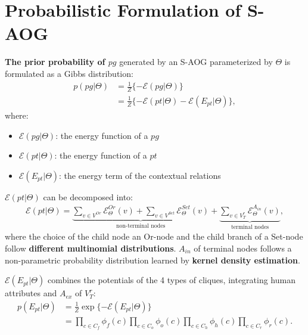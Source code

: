 \documentclass[10pt]{article}
\begin{document}
\section{Probabilistic Formulation of S-AOG}%
\label{sec:formulation}
\textbf{The prior probability of $pg$} generated by an S-AOG parameterized by
$\Theta$ is formulated as a Gibbs distribution:
%
\begin{align}
  p(pg \vert \Theta) &= \frac{1}{Z} \{-\mathcal{E}(pg \vert \Theta)\} \label{eq:1} \\
                     &= \frac{1}{Z} \{-\mathcal{E}(pt \vert \Theta) - \mathcal{E}(E_{pt} \vert \Theta)\}, \label{eq:2}
\end{align}
%
where:
%
\begin{itemize}
  \item $\mathcal{E}(pg \vert \Theta)$: the energy function of a $pg$
  \item $\mathcal{E}(pt \vert \Theta)$: the energy function of a $pt$
  \item $\mathcal{E}(E_{pt} \vert \Theta)$: the energy term of the contextual
    relations
\end{itemize}
%
$\mathcal{E}(pt \vert \Theta)$ can be decomposed into:
%
\begin{align}
  \label{eq:3}
  \mathcal{E}(pt \vert \Theta) = \underbrace{\sum_{v \in V^{Or}} \mathcal{E}^{Or}_{\Theta}(v) + \sum_{v \in V^{Set}} \mathcal{E}^{Set}_{\Theta}(v)}_{\text{non-terminal nodes}} + \underbrace{\sum_{v \in V^r_T} \mathcal{E}^{A_{in}}_{\Theta}(v)}_{\text{terminal nodes}},
\end{align}
%
where the choice of the child node an Or-node and the child branch of a
Set-node follow \textbf{different multinomial distributions}. $A_{in}$ of
terminal nodes follows a non-parametric probability distribution learned by
\textbf{kernel density estimation}.

$\mathcal{E}(E_{pt} \vert \Theta)$ combines the potentials of the 4 types of
cliques, integrating human attributes and $A_{ex}$ of $V^r_T$:
%
\begin{align}
  p(E_{pt} \vert \Theta) &= \frac{1}{Z} \exp \{-\mathcal{E}(E_{pt} \vert \Theta)\} \label{eq:4} \\
                         &= \prod_{c \in C_f} \phi_f(c) \prod_{c \in C_o} \phi_o(c) \prod_{c \in C_h} \phi_h(c) \prod_{c \in C_r} \phi_r(c). \label{eq:5}
\end{align}
%
\end{document}
